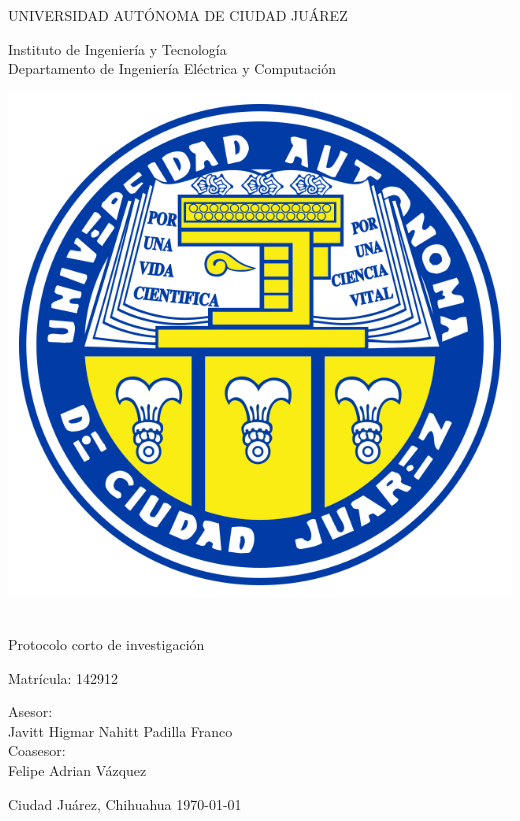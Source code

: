 \thispagestyle{empty}

\begin{center} \vfill

{\Large UNIVERSIDAD AUTÓNOMA DE CIUDAD JUÁREZ}\\
\vspace{6mm}
{\large Instituto de Ingeniería y Tecnología\\
\vspace{6mm}
Departamento de Ingeniería Eléctrica y Computación
\vspace{20mm}

\includegraphics [scale=0.7]{images/escudo-uacj.png}
\vspace{10mm}

\thetitle\\

\vspace{15mm}
Protocolo corto de investigación\\
\vspace{5mm}

\theauthor\hspace{10mm} Matrícula: 142912\\
\vspace{15mm}

Asesor:\\
Javitt Higmar Nahitt Padilla Franco
\\
\vspace{5mm}
Coasesor:\\
Felipe Adrian Vázquez

} \vfill
	Ciudad Juárez, Chihuahua \hspace{30mm}\today


\end{center}
